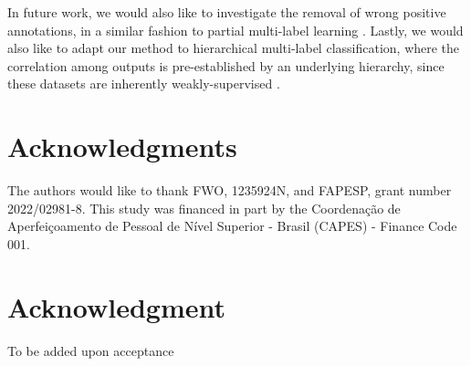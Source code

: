 \documentclass[conference,compsoc]{IEEEtran}
\begin{document}
%
%
%
%
In future work, we would also like to investigate the removal of wrong positive annotations, in a similar fashion to partial multi-label learning \cite{xie2018partial}. Lastly, we would also like to adapt our method to hierarchical multi-label classification, where the correlation among outputs is pre-established by an underlying hierarchy, since these datasets are inherently weakly-supervised \cite{nakano2019machine}. 



\section*{Acknowledgments}

The authors would like to thank FWO, 1235924N, and FAPESP, grant number 2022/02981-8. This study was financed in part by the Coordenação de
Aperfeiçoamento de Pessoal de Nível Superior - Brasil (CAPES) - Finance Code 001. 

\iffalse  %
    \ifCLASSOPTIONcompsoc
      \section*{Acknowledgments}
    \else
      \section*{Acknowledgment}
      To be added upon acceptance
    \fi
    
\fi




\end{document}
